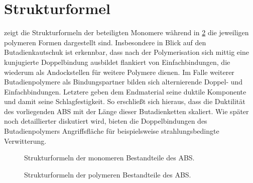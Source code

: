     \section{Strukturformel}
         zeigt die Strukturformeln der beteiligten Monomere während in \cref{fig:strukturformeln polymere}
        die jeweiligen polymeren Formen dargestellt sind. Insbesondere in Blick auf den Butadienkautschuk ist erkennbar,
        dass nach der Polymerisation sich mittig eine kunjugierte Doppelbindung ausbildet flankiert von Einfachbindungen,
        die wiederum als Andockstellen für weitere Polymere dienen. Im Falle weiterer Butadienpolymere als Bindungspartner
        bilden sich alternierende Doppel- und Einfachbindungen. Letztere geben dem Endmaterial seine duktile Komponente und
        damit seine Schlagfestigkeit. So erschließt sich hieraus, dass die Duktilität des vorliegenden ABS mit der Länge
        dieser Butadienketten skaliert. Wie später noch detaillierter diskutiert wird, bieten die Doppelbindungen des Butadienpolymers
        Angriffsfläche für beispielsweise strahlungsbedingte Verwitterung.
        \begin{figure}[H]%
            \centering
            \qquad
            \qquad
            \caption[Strukturformeln der monomeren Bestandteile des ABS]{Strukturformeln der monomeren Bestandteile des ABS.}%
            \label{fig:strukturformeln_monomere}%
        \end{figure}

        \begin{figure}[H]%
            \centering
            \qquad
            \qquad
            \caption[Strukturformeln der polymeren Bestandteile des ABS]{Strukturformeln der polymeren Bestandteile des ABS.}%
            \label{fig:strukturformeln polymere}%
        \end{figure}

